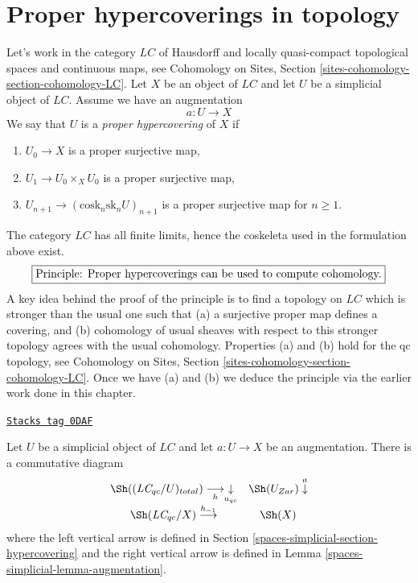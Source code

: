 \section{Proper hypercoverings in topology}
\label{spaces-simplicial-section-proper-hypercovering}
Let's work in the category $\textit{LC}$ of Hausdorff and locally
quasi-compact topological spaces and continuous maps, see
Cohomology on Sites, Section \ref{sites-cohomology-section-cohomology-LC}.
Let $X$ be an object of $\textit{LC}$ and let $U$ be a simplicial
object of $\textit{LC}$. Assume we have an augmentation
$$
a : U \to X
$$
We say that $U$ is a {\it proper hypercovering} of $X$ if
\begin{enumerate}
\item $U_0 \to X$ is a proper surjective map,
\item $U_1 \to U_0 \times_X U_0$ is a proper surjective map,
\item $U_{n + 1} \to (\text{cosk}_n\text{sk}_n U)_{n + 1}$
is a proper surjective map for $n \geq 1$.
\end{enumerate}
The category $\textit{LC}$ has all finite limits, hence the
coskeleta used in the formulation above exist.
$$
\fbox{Principle: Proper hypercoverings can be used to compute cohomology.}
$$
A key idea behind the proof of the principle is to find a topology
on $\textit{LC}$ which is stronger than the usual one such that
(a) a surjective proper map defines a covering, and
(b) cohomology of usual sheaves with respect to this stronger
topology agrees with the usual cohomology.
Properties (a) and (b) hold for the qc topology, see
Cohomology on Sites, Section \ref{sites-cohomology-section-cohomology-LC}.
Once we have (a) and (b) we deduce the principle via
the earlier work done in this chapter.

\begin{lemma}
\label{spaces-simplicial-lemma-compare-simplicial-objects}
\href{https://stacks.math.columbia.edu/tag/0DAF}{\texttt{Stacks tag 0DAF}}

Let $U$ be a simplicial object of $\textit{LC}$ and let $a : U \to X$
be an augmentation. There is a commutative diagram
$$
\begin{array}{cc}\Sh((\textit{LC}_{qc}/U)_{total}) \underset{h}{\longrightarrow}\underset{a_{qc}}{\downarrow} & \Sh(U_{Zar}) \overset{a}{\downarrow} \\ \Sh(\textit{LC}_{qc}/X) \overset{h_{-1}}{\longrightarrow} & \Sh(X)\end{array}
$$
where the left vertical arrow is defined in
Section \ref{spaces-simplicial-section-hypercovering}
and the right vertical arrow is defined in
Lemma \ref{spaces-simplicial-lemma-augmentation}.
\end{lemma}

